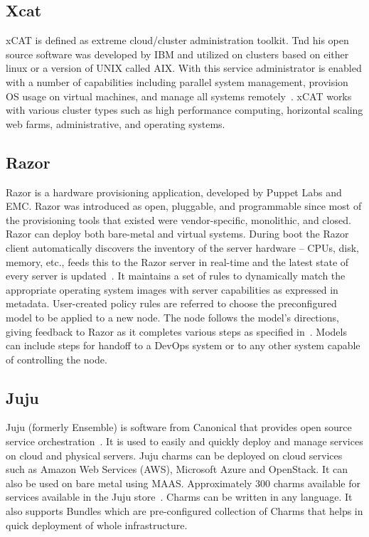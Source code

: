 \subsection{Xcat}

xCAT is defined as extreme cloud/cluster administration toolkit. Tnd
his open source software was developed by IBM and utilized on clusters
based on either linux or a version of UNIX called AIX. With this
service administrator is enabled with a number of capabilities
including parallel system management, provision OS usage on virtual
machines, and manage all systems remotely~\cite{www-xcat}. xCAT works
with various cluster types such as high performance computing,
horizontal scaling web farms, administrative, and operating
systems.~\cite{www-03ibm}

     \pv
     
\subsection{Razor}

Razor is a hardware provisioning application, developed by Puppet Labs
and EMC. Razor was introduced as open, pluggable, and programmable
since most of the provisioning tools that existed were
vendor-specific, monolithic, and closed. Razor can deploy both
bare-metal and virtual systems. During boot the Razor client
automatically discovers the inventory of the server hardware – CPUs,
disk, memory, etc., feeds this to the Razor server in real-time and
the latest state of every server is updated~\cite{www-RazorWiki}. It
maintains a set of rules to dynamically match the appropriate
operating system images with server capabilities as expressed in
metadata. User-created policy rules are referred to choose the
preconfigured model to be applied to a new node. The node follows the
model's directions, giving feedback to Razor as it completes various
steps as specified in~\cite{www-RazorPuppet}. Models can include steps
for handoff to a DevOps system or to any other system capable of
controlling the node.

     \pv

\subsection{Juju}

Juju (formerly Ensemble) is software from Canonical that provides open
source service orchestration~\cite{juju-paper}.  It is used to easily
and quickly deploy and manage services on cloud and physical
servers. Juju charms can be deployed on cloud services such as Amazon
Web Services (AWS), Microsoft Azure and OpenStack. It can also be used
on bare metal using MAAS.  Approximately 300 charms available for
services available in the Juju store~\cite{www-juju}. Charms can be
written in any language. It also supports Bundles which are
pre-configured collection of Charms that helps in quick deployment of
whole infrastructure.


